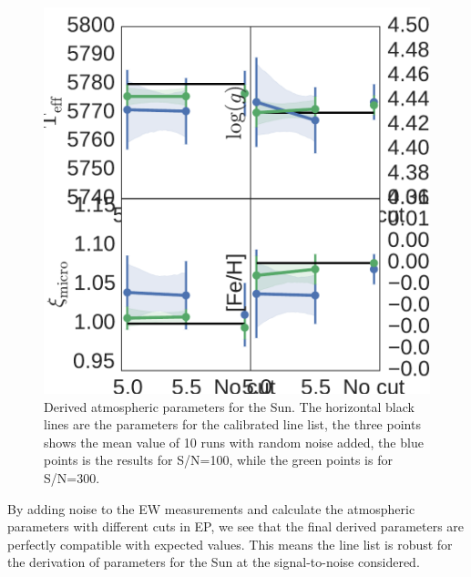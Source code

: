 \documentclass{aa}
\begin{document}
\begin{figure}[t!]
    \centering
    \includegraphics[width=1.0\linewidth]{figures/solar_parameters_10runs.pdf}
    \caption{Derived atmospheric parameters for the Sun. The horizontal
    black lines are the parameters for the calibrated line list, the
    three points shows the mean value of 10 runs with random noise
    added, the blue points is the results for S/N=100, while the
    green points is for S/N=300.}
    \label{fig:solar_parameters}
\end{figure}

By adding noise to the EW measurements and calculate the atmospheric
parameters with different cuts in EP, we see that the final derived
parameters are perfectly compatible with expected values. This means the
line list is robust for the derivation of parameters for the Sun at the
signal-to-noise considered.
\end{document}
